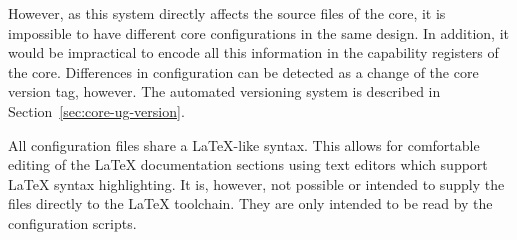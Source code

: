 However, as this system directly affects the source files of the core, it is 
impossible to have different core configurations in the same design. In 
addition, it would be impractical to encode all this information in the 
capability registers of the core. Differences in configuration can be detected 
as a change of the core version tag, however. The automated versioning system is 
described in Section~\ref{sec:core-ug-version}.

All configuration files share a LaTeX-like syntax. This allows for comfortable
editing of the LaTeX documentation sections using text editors which support
LaTeX syntax highlighting. It is, however, not possible or intended to supply
the files directly to the LaTeX toolchain. They are only intended to be read by
the configuration scripts.

